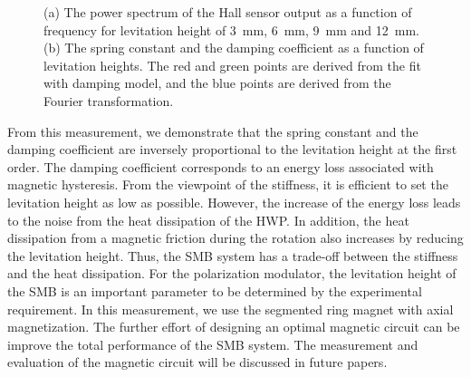 \documentclass[a4paper,11pt]{jpconf}
\begin{document}
\begin{figure}[htbp]
  \centering
  \begin{minipage}{0.45\hsize}
  \end{minipage}
  \begin{minipage}{0.45\hsize}
    \centering
  \end{minipage}
  \caption{(a) The power spectrum of the Hall sensor output as a function of frequency for levitation height of 3~mm, 6~mm, 9~mm and 12~mm.
    (b) The spring constant and the damping coefficient as a function of levitation heights.
    The red and green points are derived from the fit with damping model, and the blue points are derived from the Fourier transformation.}
  \label{fig:fft}
\end{figure}

From this measurement, we demonstrate that the spring constant and the damping coefficient are inversely proportional to the levitation height at the first order.
The damping coefficient corresponds to an energy loss associated with magnetic hysteresis.
From the viewpoint of the stiffness, it is efficient to set the levitation height as low as possible.
However, the increase of the energy loss leads to the noise from the heat dissipation of the HWP.
In addition, the heat dissipation from a magnetic friction during the rotation also increases by reducing the levitation height.
Thus, the SMB system has a trade-off between the stiffness and the heat dissipation.
For the polarization modulator, the levitation height of the SMB is an important parameter to be determined by the experimental requirement.
In this measurement, we use the segmented ring magnet with axial magnetization.
The further effort of designing an optimal magnetic circuit can be improve the total performance of the SMB system.
The measurement and evaluation of the magnetic circuit will be discussed in future papers.
\end{document}
